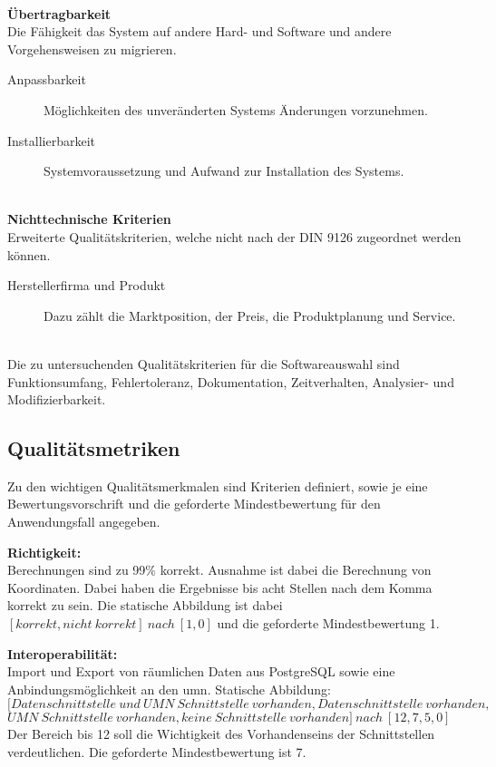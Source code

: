 \ \\
%
\textbf{Übertragbarkeit}\\
Die Fähigkeit das System auf andere Hard- und Software und andere Vorgehensweisen zu migrieren.
\begin{description}
\item[Anpassbarkeit] Möglichkeiten des unveränderten Systems Änderungen vorzunehmen.
\item[Installierbarkeit] Systemvoraussetzung und Aufwand zur Installation des Systems.
\end{description}
\ \\
%
\textbf{Nichttechnische Kriterien}\\
Erweiterte Qualitätskriterien, welche nicht nach der DIN 9126 zugeordnet werden können.
\begin{description}
\item[Herstellerfirma und Produkt] Dazu zählt die Marktposition, der Preis, die Produktplanung und Service.
\end{description}
\ \\
%
Die zu untersuchenden Qualitätskriterien für die Softwareauswahl sind Funktionsumfang, Fehlertoleranz, Dokumentation, Zeitverhalten, Analysier- und Modifizierbarkeit.


\subsection{Qualitätsmetriken}
\label{qualitätsmetriken}
Zu den wichtigen Qualitätsmerkmalen sind Kriterien definiert, sowie je eine Bewertungsvorschrift und die geforderte Mindestbewertung für den Anwendungsfall angegeben.

\textbf{Richtigkeit:}\\
Berechnungen sind zu 99\% korrekt. Ausnahme ist dabei die Berechnung von Koordinaten. Dabei haben die Ergebnisse bis acht Stellen nach dem Komma korrekt zu sein.
Die statische Abbildung ist dabei $[korrekt, nicht\ korrekt]\ nach\ [1, 0]$ und die geforderte Mindestbewertung 1.

\textbf{Interoperabilität:}\\
Import und Export von räumlichen Daten aus PostgreSQL sowie eine Anbindungsmöglichkeit an den \Gls{umn}.
Statische Abbildung:\\
$[Datenschnittstelle\ und\ UMN\ Schnittstelle\ vorhanden,Datenschnittstelle\ vorhanden,$\\$UMN\ Schnittstelle\ vorhanden,keine\ Schnittstelle\ vorhanden]\ nach\ [12,7,5,0]$\\
Der Bereich bis 12 soll die Wichtigkeit des Vorhandenseins der Schnittstellen verdeutlichen.
Die geforderte Mindestbewertung ist 7.

